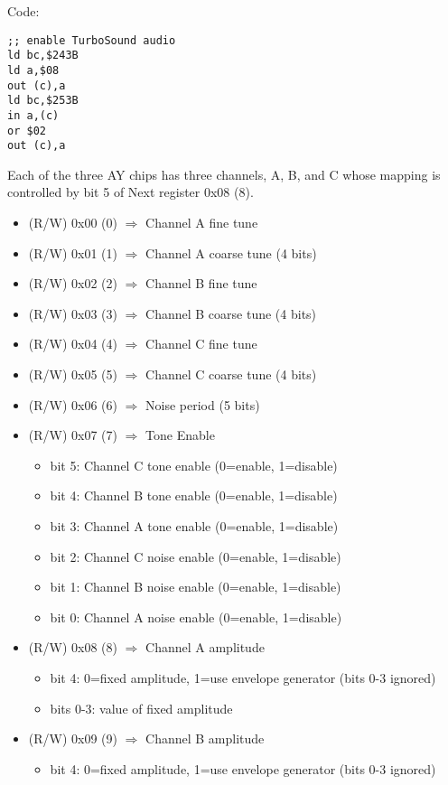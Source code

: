 Code:
\begin{verbatim}
;; enable TurboSound audio
ld bc,$243B
ld a,$08
out (c),a
ld bc,$253B
in a,(c)
or $02
out (c),a
\end{verbatim}

Each of the three AY chips has three channels, A, B, and C whose
mapping is controlled by bit 5 of Next register 0x08 (8).

\begin{itemize}
\item (R/W) 0x00 (0) $\Rightarrow$ Channel A fine tune
\item (R/W) 0x01 (1) $\Rightarrow$ Channel A coarse tune (4 bits)
\item (R/W) 0x02 (2) $\Rightarrow$ Channel B fine tune
\item (R/W) 0x03 (3) $\Rightarrow$ Channel B coarse tune (4 bits)
\item (R/W) 0x04 (4) $\Rightarrow$ Channel C fine tune
\item (R/W) 0x05 (5) $\Rightarrow$ Channel C coarse tune (4 bits)
\item (R/W) 0x06 (6) $\Rightarrow$ Noise period (5 bits)
\item (R/W) 0x07 (7) $\Rightarrow$ Tone Enable
  \begin{itemize}
  \item bit 5: Channel C tone enable (0=enable, 1=disable)
  \item bit 4: Channel B tone enable (0=enable, 1=disable)
  \item bit 3: Channel A tone enable (0=enable, 1=disable)
  \item bit 2: Channel C noise enable (0=enable, 1=disable)
  \item bit 1: Channel B noise enable (0=enable, 1=disable)
  \item bit 0: Channel A noise enable (0=enable, 1=disable)
  \end{itemize}
\item (R/W) 0x08 (8) $\Rightarrow$ Channel A amplitude
  \begin{itemize}
  \item bit 4: 0=fixed amplitude, 1=use envelope generator (bits 0-3 ignored)
  \item bits 0-3: value of fixed amplitude
  \end{itemize}
\item (R/W) 0x09 (9) $\Rightarrow$ Channel B amplitude
  \begin{itemize}
  \item bit 4: 0=fixed amplitude, 1=use envelope generator (bits 0-3 ignored)

\end{itemize}
\end{itemize}

